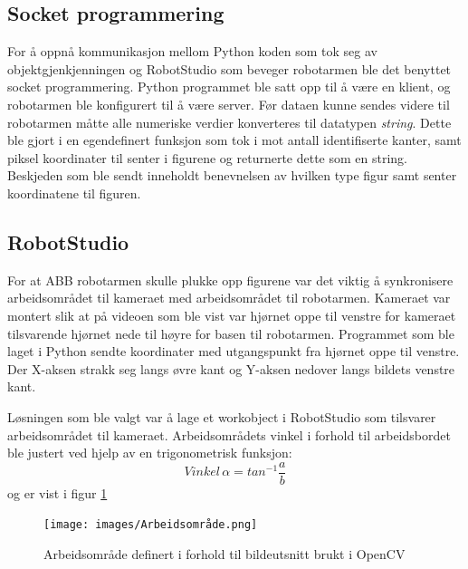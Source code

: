 \documentclass[conference]{IEEEtran}
\begin{document}
    \subsection{Socket programmering}
        For å oppnå kommunikasjon mellom Python koden som tok seg av objektgjenkjenningen og RobotStudio som beveger robotarmen ble det benyttet socket programmering. Python programmet ble satt opp til å være en klient, og robotarmen ble konfigurert til å være server. Før dataen kunne sendes videre til robotarmen måtte alle numeriske verdier konverteres til datatypen \textit{string}.  Dette ble gjort i en egendefinert funksjon som tok i mot antall identifiserte kanter, samt piksel koordinater til senter i figurene og returnerte dette som en string. Beskjeden som ble sendt inneholdt benevnelsen av hvilken type figur samt senter koordinatene til figuren.

    \subsection{RobotStudio}
        For at ABB robotarmen skulle plukke opp figurene var det viktig å synkronisere arbeidsområdet til kameraet med arbeidsområdet til robotarmen. 
        Kameraet var montert slik at på videoen som ble vist var hjørnet oppe til venstre for kameraet tilsvarende hjørnet nede til høyre for basen til robotarmen. Programmet som ble laget i Python sendte koordinater med utgangspunkt fra hjørnet oppe til venstre. Der X-aksen strakk seg langs øvre kant og Y-aksen nedover langs bildets venstre kant.

        Løsningen som ble valgt var å lage et workobject i RobotStudio som tilsvarer arbeidsområdet til kameraet. Arbeidsområdets vinkel i forhold til arbeidsbordet ble justert ved hjelp av en trigonometrisk funksjon:
        \begin{equation*}
            Vinkel \,\alpha = tan^{-1}\frac{a}{b}
        \end{equation*}
        og er vist i figur \ref{fig:robotstudio}
        \begin{figure}[!htb]
            \centering
            \begin{minipage}
            \end{minipage}
            \begin{minipage}
                \texttt{[image: images/Arbeidsområde.png]}
            \end{minipage}
            \caption{Arbeidsområde definert i forhold til bildeutsnitt brukt i OpenCV}
            \label{fig:robotstudio}
        \end{figure}
\end{document}
